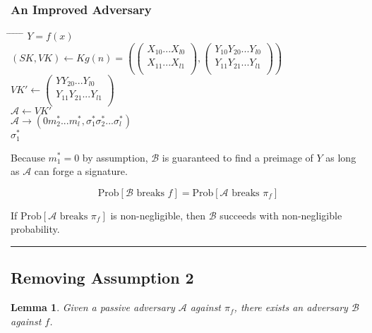 \documentclass[twoside]{article}
\newtheorem{lemma}[theorem]{Lemma}
\newenvironment{proof}{{\bf Proof:}}{\hfill\rule{2mm}{2mm}}
\begin{document}
\begin{proof}
\subsubsection{An Improved Adversary}

\begin{tabbing}
\hspace*{.25in} \= \hspace*{.25in} \= \hspace*{.25in} \= \hspace*{.25in} \= \hspace*{.25in} \=\kill
{} $Y = f(x)$\\
\>$(SK, VK) \leftarrow Kg(n) = \left(
\begin{pmatrix}
X_{10}...X_{l0}\\
X_{11}...X_{l1}\\
\end{pmatrix},
\begin{pmatrix}
Y_{10}Y_{20}...Y_{l0}\\
Y_{11}Y_{21}...Y_{l1}\\
\end{pmatrix}\right)$\\
\>$VK' \leftarrow
\begin{pmatrix}
YY_{20}...Y_{l0}\\
Y_{11}Y_{21}...Y_{l1}\\
\end{pmatrix}$\\
\>$\mathcal{A} \leftarrow VK'$\\
\>$\mathcal{A} \rightarrow (0m^*_2...m^*_l,\sigma^*_1\sigma^*_2...\sigma^*_l)$\\
 $\sigma^*_1$
\end{tabbing}

Because $m^*_1 = 0$ by assumption, $\mathcal{B}$ is guaranteed to find a preimage of $Y$ as long as $\mathcal{A}$ can forge a signature.

$$\text{Prob}[\mathcal{B}\text{ breaks }f] = \text{Prob}[\mathcal{A}\text{ breaks }\pi_f]$$

If $\text{Prob}[\mathcal{A}\text{ breaks }\pi_f]$ is non-negligible, then $\mathcal{B}$ succeeds with non-negligible probability.
\end{proof}

\subsection{Removing Assumption 2}

\begin{lemma}
Given a passive adversary $\mathcal{A}$ against $\pi_f$, there exists an adversary $\mathcal{B}$ against $f$.
\end{lemma}
\end{document}
